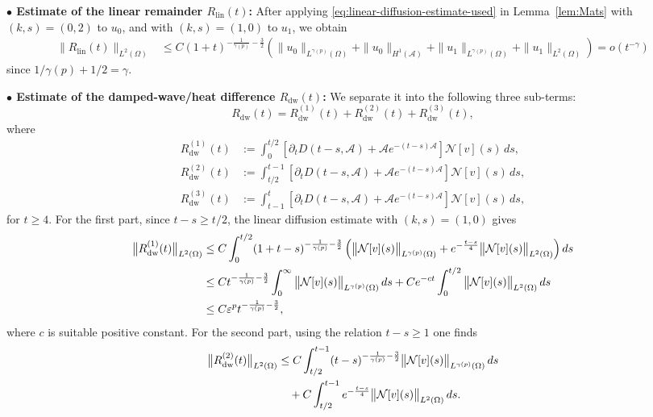 \documentclass[a4paper,11pt]{article} %
\theoremstyle{remark}
\theoremstyle{definition}
\numberwithin{equation}{section}
\begin{document}
\noindent\textbf{$\bullet$ Estimate of the linear remainder $R_{\mathrm{lin}}(t)$:} After applying \eqref{eq:linear-diffusion-estimate-used} in Lemma~\ref{lem:Mats} with $(k,s)=(0,2)$ to \(u_0\), and with $(k,s)=(1,0)$
to \(u_1\), we obtain
\begin{align}
\label{eq:Rlin-little-o}
\|R_{\mathrm{lin}}(t)\|_{L^2(\Omega)}
&\le
C(1+t)^{-\frac{1}{\gamma(p)}-\frac{3}{2}}
\left(
\|u_0\|_{L^{\gamma(p)}(\Omega)}
+
\|u_0\|_{H^1(\mathcal{A})}
+
\|u_1\|_{L^{\gamma(p)}(\Omega)}
+
\|u_1\|_{L^2(\Omega)}
\right) = o(t^{-\gamma})
\end{align}
since $1/\gamma(p)+1/2=\gamma$. \medskip

\noindent\textbf{$\bullet$ Estimate of the damped-wave/heat difference $R_{\mathrm{dw}}(t)$:} We separate it into the following three sub-terms:
\[
R_{\mathrm{dw}}(t)
=
R_{\mathrm{dw}}^{(1)}(t)
+
R_{\mathrm{dw}}^{(2)}(t)
+
R_{\mathrm{dw}}^{(3)}(t),
\]
where
\begin{align*}
R_{\mathrm{dw}}^{(1)}(t)
&:=
\int_0^{t/2}
\left[
\partial_tD(t-s,\mathcal{A})+\mathcal{A}e^{-(t-s)\mathcal{A}}
\right]\mathcal{N}[v](s)\,ds,\\
R_{\mathrm{dw}}^{(2)}(t)
&:=
\int_{t/2}^{t-1}
\left[
\partial_tD(t-s,\mathcal{A})+\mathcal{A}e^{-(t-s)\mathcal{A}}
\right]\mathcal{N}[v](s)\,ds,\\
R_{\mathrm{dw}}^{(3)}(t)
&:=
\int_{t-1}^{t}
\left[
\partial_tD(t-s,\mathcal{A})+\mathcal{A}e^{-(t-s)\mathcal{A}}
\right]\mathcal{N}[v](s)\,ds,
\end{align*}
for \(t\ge4\). For the first part, since \(t-s\ge t/2\), the linear diffusion
estimate with \((k,s)=(1,0)\) gives
\begin{align}
\big\|R_{\mathrm{dw}}^{(1)}(t)\big\|_{L^2(\Omega)}
&\le
C\int_0^{t/2}
(1+t-s)^{-\frac{1}{\gamma(p)}-\frac{3}{2}}
\left(
\big\|\mathcal{N}[v](s)\big\|_{L^{\gamma(p)}(\Omega)}
+
e^{-\frac{t-s}{4}}\big\|\mathcal{N}[v](s)\big\|_{L^2(\Omega)}
\right)ds \notag\\
&\le
Ct^{-\frac{1}{\gamma(p)}-\frac{3}{2}}
\int_0^\infty\big\|\mathcal{N}[v](s)\big\|_{L^{\gamma(p)}(\Omega)}\,ds
+
Ce^{-ct}
\int_0^{t/2}\big\|\mathcal{N}[v](s)\big\|_{L^2(\Omega)}\,ds \notag\\
&\le
C\varepsilon^p t^{-\frac{1}{\gamma(p)}-\frac{3}{2}},
\label{eq:Rdw1-estimate}
\end{align}
where $c$ is suitable positive constant. For the second part, using the relation \(t-s\ge1\) one finds
\begin{align*}
\big\|R_{\mathrm{dw}}^{(2)}(t)\big\|_{L^2(\Omega)}
&\le
C\int_{t/2}^{t-1}
(t-s)^{-\frac{1}{\gamma(p)}-\frac{3}{2}}\big\|\mathcal{N}[v](s)\big\|_{L^{\gamma(p)}(\Omega)}\,ds \notag\\
&\quad
+
C\int_{t/2}^{t-1}
e^{-\frac{t-s}{4}}\big\|\mathcal{N}[v](s)\big\|_{L^2(\Omega)}\,ds.
\end{align*}
\end{document}

